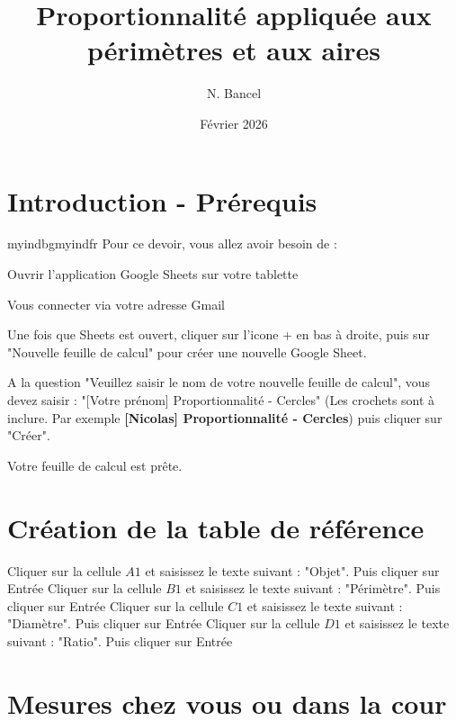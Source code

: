 \documentclass{exam}
\title{Proportionnalité appliquée aux périmètres et aux aires}
\author{N. Bancel}
\date{Février 2026}
\begin{document}
{\let\newpage\relax\maketitle}

\section{Introduction - Prérequis}

\begin{Indication}{myindbg}{myindfr}
  Pour ce devoir, vous allez avoir besoin de : 
  \begin{compactitem}
    \item Ouvrir l'application Google Sheets sur votre tablette
    \item Vous connecter via votre adresse Gmail
    \item Une fois que Sheets est ouvert, cliquer sur l'icone + en bas à droite, puis sur "Nouvelle feuille de calcul" pour créer une nouvelle Google Sheet.
    \item A la question "Veuillez saisir le nom de votre nouvelle feuille de calcul", vous devez saisir : "[Votre prénom] Proportionnalité - Cercles" (Les crochets sont à inclure. Par exemple \textbf{[Nicolas] Proportionnalité - Cercles}) puis cliquer sur "Créer".
  \end{compactitem}

  Votre feuille de calcul est prête.
\end{Indication}

\section{Création de la table de référence}

\begin{questions}
  \question Cliquer sur la cellule $A1$ et saisissez le texte suivant : "Objet". Puis cliquer sur Entrée
  \question Cliquer sur la cellule $B1$ et saisissez le texte suivant : "Périmètre". Puis cliquer sur Entrée
  \question Cliquer sur la cellule $C1$ et saisissez le texte suivant : "Diamètre". Puis cliquer sur Entrée
  \question Cliquer sur la cellule $D1$ et saisissez le texte suivant : "Ratio". Puis cliquer sur Entrée
\end{questions}

\section{Mesures chez vous ou dans la cour}
\end{document}
